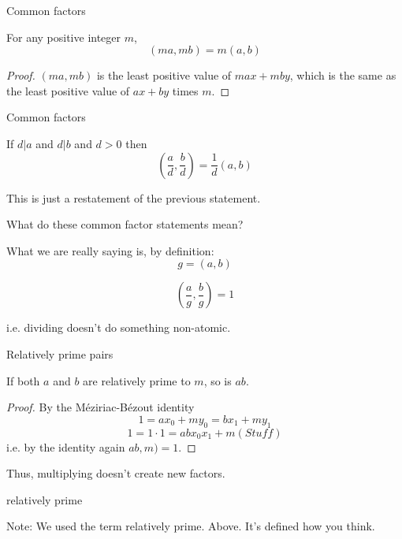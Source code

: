 \documentclass{beamer}
\begin{document}
\begin{frame}{Common factors}

  \begin{theorem} For any positive integer $m$, 
    $$(ma, mb) = m(a, b)$$
  \end{theorem}
  
  \begin{proof}
    $(ma, mb)$ is the least positive value of $max+mby$, which is the
    same as the least positive value of $ax+by$ times $m$.
  \end{proof}
  
\end{frame}

\begin{frame}{Common factors}

  \begin{theorem}
    If $d | a$ and $d | b$ and $d > 0$ then 
    $$(\frac{a}{d}, \frac{b}{d}) = \frac{1}{d}(a, b)$$
  \end{theorem}

This is just a restatement of the previous statement.

\end{frame}

\begin{frame}{What do these common factor statements mean?}

  What we are really saying is, by definition:
  $$g = (a, b)$$
  
  $$( \frac{a}{g}, \frac{b}{g} ) = 1$$

  i.e. dividing doesn't do something non-atomic.

\end{frame}

\begin{frame}{Relatively prime pairs}

  If both $a$ and $b$ are relatively prime to $m$, so is $ab$.
  
  \begin{proof}
    By the M\'eziriac-B\'ezout identity 
    $$1 = ax_0 + my_0 = bx_1 + my_1$$
    $$1 = 1 \cdot 1 = abx_0x_1 + m( Stuff)$$
    i.e. by the identity again $ab, m) = 1$.
  \end{proof}
  
  Thus, multiplying doesn't create new factors.

\end{frame}

\begin{frame}{relatively prime}

  Note: We used the term relatively prime. Above. It's defined how you
  think.

\end{frame}
\end{document}
